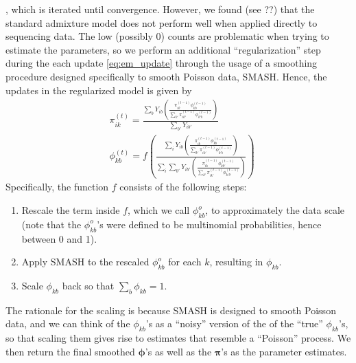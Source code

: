 \documentclass[11pt]{article}
\begin{document}
, which is iterated until convergence.
However, we found (see ??) that the standard admixture model does not perform well when applied directly to sequencing data. The low (possibly 0) counts are problematic when trying to estimate the parameters, so we perform an additional ``regularization'' step during the each update \ref{eq:em_update} through the usage of a smoothing procedure designed specifically to smooth Poisson data, SMASH. Hence, the updates in the regularized model is given by
\begin{eqnarray}\label{eq:em_update_reg}
&{\pi}_{ik}^{(t)}=\frac{\sum_b Y_{ib}\left(\frac{\pi_{ik}^{(t-1)}{\phi}_{kb}^{(t-1)}}{\sum_{k'}\pi_{ik'}^{(t-1)}{\phi}_{k'b}^{(t-1)}}\right)}{\sum_{b'}Y_{ib'}}\\
&{\phi}_{kb}^{(t)}=f\left(\frac{\sum_i Y_{ib}\left(\frac{\pi_{ik}^{(t-1)}{\phi}_{kb}^{(t-1)}}{\sum_{k'}\pi_{ik'}^{(t-1)}{\phi}_{k'b}^{(t-1)}}\right)}{\sum_i\sum_{b'} Y_{ib'}\left(\frac{\pi_{ik}^{(t-1)}{\phi}_{kb'}^{(t-1)}}{\sum_{k'}\pi_{ik'}^{(t-1)}{\phi}_{k'b'}^{(t-1)}}\right)}\right)
\end{eqnarray}
Specifically, the function $f$ consists of the following steps:
\begin{enumerate}
\item Rescale the term inside $f$, which we call $\phi_{kb}^o$, to approximately the data scale (note that the $\phi_{kb}^o$'s were defined to be multinomial probabilities, hence between 0 and 1).
\item Apply SMASH to the rescaled $\phi_{kb}^o$ for each $k$, resulting in ${\phi}_{kb}$.
\item Scale ${\phi}_{kb}$ back so that $\sum_b{\phi}_{kb}=1$. 
\end{enumerate}
The rationale for the scaling is because SMASH is designed to smooth Poisson data, and we can think of the $\phi_{kb}$'s as a ``noisy'' version of the of the ``true'' $\phi_{kb}$'s, so that scaling them gives rise to estimates that resemble a ``Poisson'' process. We then return the final smoothed $\bm{\phi}$'s as well as the $\bm{\pi}$'s as the parameter estimates.
\end{document}
